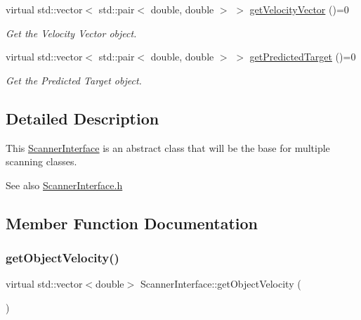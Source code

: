 \begin{DoxyCompactItemize}
virtual std\+::vector$<$ std\+::pair$<$ double, double $>$ $>$ \hyperlink{classScannerInterface_a9dce1c9696b08fc10a1db681a479b0a9}{get\+Velocity\+Vector} ()=0
\begin{DoxyCompactList}\small\item\em Get the Velocity Vector object. \end{DoxyCompactList}\item 
virtual std\+::vector$<$ std\+::pair$<$ double, double $>$ $>$ \hyperlink{classScannerInterface_a27f991c8667a4c2524580addd264ae70}{get\+Predicted\+Target} ()=0
\begin{DoxyCompactList}\small\item\em Get the Predicted Target object. \end{DoxyCompactList}\end{DoxyCompactItemize}


\subsection{Detailed Description}
This \hyperlink{classScannerInterface}{Scanner\+Interface} is an abstract class that will be the base for multiple scanning classes. 

\begin{DoxySeeAlso}{See also}
\hyperlink{ScannerInterface_8h}{Scanner\+Interface.\+h} 
\end{DoxySeeAlso}


\subsection{Member Function Documentation}
\mbox{\label{classScannerInterface_a7f6b7a9cd907c8fdde13784ae3caec00}} 
\subsubsection{\texorpdfstring{get\+Object\+Velocity()}{getObjectVelocity()}}
{\footnotesize\ttfamily virtual std\+::vector$<$double$>$ Scanner\+Interface\+::get\+Object\+Velocity (\begin{DoxyParamCaption}{ }\end{DoxyParamCaption})\hspace{0.3cm}{\ttfamily [pure virtual]}}



